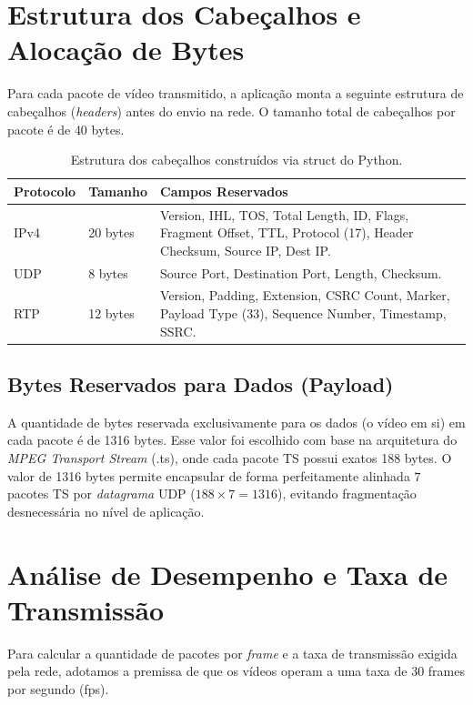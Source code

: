 \documentclass[12pt]{article}
\begin{document}
\section{Estrutura dos Cabeçalhos e Alocação de Bytes}
Para cada pacote de vídeo transmitido, a aplicação monta a seguinte estrutura de cabeçalhos (\textit{headers}) antes do envio na rede. O tamanho total de cabeçalhos por pacote é de {40 bytes}.

\begin{table}[H]
\centering
\begin{tabular}{@{}llp{8cm}@{}}
\toprule
{Protocolo} & {Tamanho} & {Campos Reservados} \\ \midrule
{IPv4}      & 20 bytes         & Version, IHL, TOS, Total Length, ID, Flags, Fragment Offset, TTL, Protocol (17), Header Checksum, Source IP, Dest IP. \\
{UDP}       & 8 bytes          & Source Port, Destination Port, Length, Checksum. \\
{RTP}       & 12 bytes         & Version, Padding, Extension, CSRC Count, Marker, Payload Type (33), Sequence Number, Timestamp, SSRC. \\ \bottomrule
\end{tabular}
\caption{Estrutura dos cabeçalhos construídos via struct do Python.}
\end{table}

\subsection{Bytes Reservados para Dados (Payload)}
A quantidade de bytes reservada exclusivamente para os dados (o vídeo em si) em cada pacote é de {1316 bytes}. Esse valor foi escolhido com base na arquitetura do \textit{MPEG Transport Stream} (.ts), onde cada pacote TS possui exatos 188 bytes. O valor de 1316 bytes permite encapsular de forma perfeitamente alinhada $7$ pacotes TS por \textit{datagrama} UDP ($188 \times 7 = 1316$), evitando fragmentação desnecessária no nível de aplicação.

\section{Análise de Desempenho e Taxa de Transmissão}
Para calcular a quantidade de pacotes por \textit{frame} e a taxa de transmissão exigida pela rede, adotamos a premissa de que os vídeos operam a uma taxa de {30 frames por segundo (fps)}.
\end{document}
